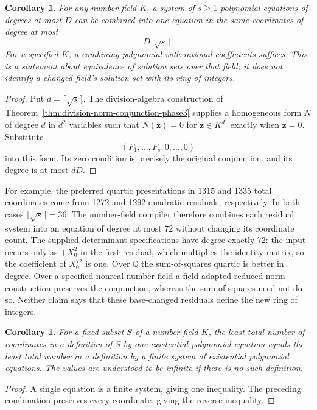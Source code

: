 \documentclass[11pt]{article}
\newtheorem{corollary}[theorem]{Corollary}
\theoremstyle{definition}
\begin{document}
\begin{corollary}\label{p3sys:division-combination}
For any number field $K$, a system of $s\ge1$ polynomial equations
of degrees at most $D$ can be combined into one equation in the
same coordinates of degree at most
\[
                         D\lceil\sqrt{s}\rceil.
\]
For a specified $K$, a combining polynomial with rational
coefficients suffices.  This is a statement about equivalence
of solution sets over that field; it does not identify a changed
field's solution set with its ring of integers.
\end{corollary}
\begin{proof}
Put $d=\lceil\sqrt{s}\rceil$.  The division-algebra construction
of Theorem~\ref{thm:division-norm-conjunction-phase3} supplies a
homogeneous form $N$ of degree $d$ in $d^2$ variables such that
$N(\mathbf z)=0$ for $\mathbf z\in K^{d^2}$ exactly when
$\mathbf z=0$.  Substitute
\[
                         (F_1,\ldots,F_s,0,\ldots,0)
\]
into this form.  Its zero condition is precisely the original
conjunction, and its degree is at most $dD$.
\end{proof}

For example, the preferred quartic presentations in 1315 and 1335
total coordinates come from 1272 and 1292 quadratic residuals,
respectively.  In both cases $\lceil\sqrt{s}\rceil=36$.
The number-field compiler therefore combines each residual system
into an equation of degree at most 72 without changing its
coordinate count.  The supplied determinant specifications have
degree exactly 72: the input occurs only as $+X_0^2$ in the
first residual, which multiplies the identity matrix, so the
coefficient of $X_0^{72}$ is one.  Over $\mathbb Q$ the
sum-of-squares quartic is better in degree.  Over a specified
nonreal number field a field-adapted reduced-norm construction preserves the
conjunction, whereas the sum of squares need not do so.  Neither
claim says that these base-changed residuals define the new ring
of integers.

\begin{corollary}\label{p3sys:minimum-variable-equality}
For a fixed subset $S$ of a number field $K$, the least total
number of coordinates in a definition of $S$ by one existential
polynomial equation equals the least total number in a definition
by a finite system of existential polynomial equations.  The
values are understood to be infinite if there is no such
definition.
\end{corollary}
\begin{proof}
A single equation is a finite system, giving one inequality.
The preceding combination preserves every coordinate, giving
the reverse inequality.
\end{proof}
\end{document}
